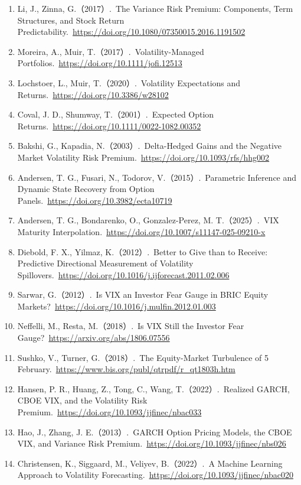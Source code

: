 \documentclass[11pt,a4paper]{article}
\begin{document}
\begin{enumerate}[leftmargin=2.2em]
  \item Li, J., Zinna, G.（2017）.\ The Variance Risk Premium: Components, Term Structures, and Stock Return Predictability.\ \url{https://doi.org/10.1080/07350015.2016.1191502}
  \item Moreira, A., Muir, T.（2017）.\ Volatility-Managed Portfolios.\ \url{https://doi.org/10.1111/jofi.12513}
  \item Lochstoer, L., Muir, T.（2020）.\ Volatility Expectations and Returns.\ \url{https://doi.org/10.3386/w28102}
  \item Coval, J. D., Shumway, T.（2001）.\ Expected Option Returns.\ \url{https://doi.org/10.1111/0022-1082.00352}
  \item Bakshi, G., Kapadia, N.（2003）.\ Delta-Hedged Gains and the Negative Market Volatility Risk Premium.\ \url{https://doi.org/10.1093/rfs/hhg002}
  \item Andersen, T. G., Fusari, N., Todorov, V.（2015）.\ Parametric Inference and Dynamic State Recovery from Option Panels.\ \url{https://doi.org/10.3982/ecta10719}
  \item Andersen, T. G., Bondarenko, O., Gonzalez-Perez, M. T.（2025）.\ VIX Maturity Interpolation.\ \url{https://doi.org/10.1007/s11147-025-09210-x}
  \item Diebold, F. X., Yilmaz, K.（2012）.\ Better to Give than to Receive: Predictive Directional Measurement of Volatility Spillovers.\ \url{https://doi.org/10.1016/j.ijforecast.2011.02.006}
  \item Sarwar, G.（2012）.\ Is VIX an Investor Fear Gauge in BRIC Equity Markets?\ \url{https://doi.org/10.1016/j.mulfin.2012.01.003}
  \item Neffelli, M., Resta, M.（2018）.\ Is VIX Still the Investor Fear Gauge?\ \url{https://arxiv.org/abs/1806.07556}
  \item Sushko, V., Turner, G.（2018）.\ The Equity-Market Turbulence of 5 February.\ \url{https://www.bis.org/publ/qtrpdf/r_qt1803h.htm}
  \item Hansen, P. R., Huang, Z., Tong, C., Wang, T.（2022）.\ Realized GARCH, CBOE VIX, and the Volatility Risk Premium.\ \url{https://doi.org/10.1093/jjfinec/nbac033}
  \item Hao, J., Zhang, J. E.（2013）.\ GARCH Option Pricing Models, the CBOE VIX, and Variance Risk Premium.\ \url{https://doi.org/10.1093/jjfinec/nbs026}
  \item Christensen, K., Siggaard, M., Veliyev, B.（2022）.\ A Machine Learning Approach to Volatility Forecasting.\ \url{https://doi.org/10.1093/jjfinec/nbac020}

\end{enumerate}
\end{document}
